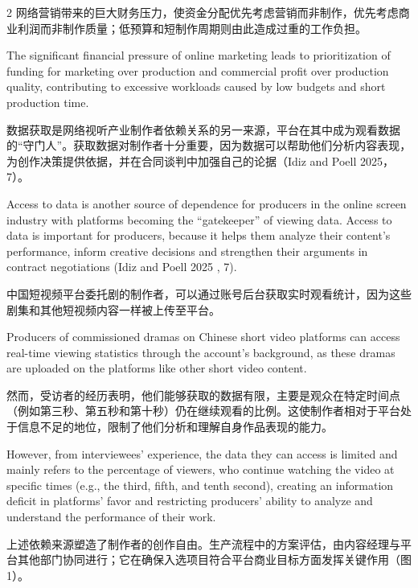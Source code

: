 \documentclass[10pt,a4paper]{article}
\begin{document}
\begin{paracol}{2}
\switchcolumn*
网络营销带来的巨大财务压力，使资金分配优先考虑营销而非制作，优先考虑商业利润而非制作质量；低预算和短制作周期则由此造成过重的工作负担。\par
\switchcolumn
The significant financial pressure of online marketing leads to prioritization of funding for marketing over production and commercial profit over production quality, contributing to excessive workloads caused by low budgets and short production time.\par
\switchcolumn*
数据获取是网络视听产业制作者依赖关系的另一来源，平台在其中成为观看数据的“守门人”。获取数据对制作者十分重要，因为数据可以帮助他们分析内容表现，为创作决策提供依据，并在合同谈判中加强自己的论据（Idiz and Poell 2025，7）。\par
\switchcolumn
Access to data is another source of dependence for producers in the online screen industry with platforms becoming the “gatekeeper” of viewing data. Access to data is important for producers, because it helps them analyze their content’s performance, inform creative decisions and strengthen their arguments in contract negotiations (Idiz and Poell 2025 , 7).\par
\switchcolumn*
中国短视频平台委托剧的制作者，可以通过账号后台获取实时观看统计，因为这些剧集和其他短视频内容一样被上传至平台。\par
\switchcolumn
Producers of commissioned dramas on Chinese short video platforms can access real-time viewing statistics through the account’s background, as these dramas are uploaded on the platforms like other short video content.\par
\switchcolumn*
然而，受访者的经历表明，他们能够获取的数据有限，主要是观众在特定时间点（例如第三秒、第五秒和第十秒）仍在继续观看的比例。这使制作者相对于平台处于信息不足的地位，限制了他们分析和理解自身作品表现的能力。\par
\switchcolumn
However, from interviewees’ experience, the data they can access is limited and mainly refers to the percentage of viewers, who continue watching the video at specific times (e.g., the third, fifth, and tenth second), creating an information deficit in platforms’ favor and restricting producers’ ability to analyze and understand the performance of their work.\par
\switchcolumn*
上述依赖来源塑造了制作者的创作自由。生产流程中的方案评估，由内容经理与平台其他部门协同进行；它在确保入选项目符合平台商业目标方面发挥关键作用（图 1）。\par

\end{paracol}
\end{document}
